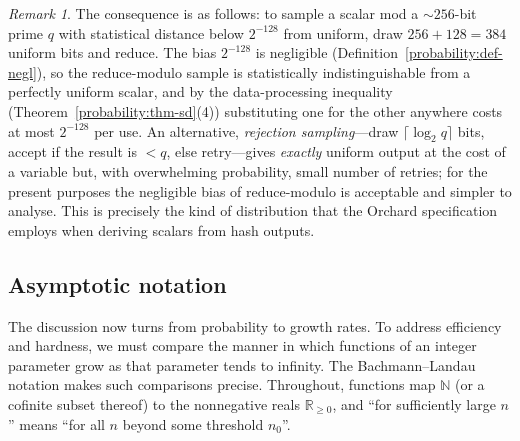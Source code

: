 \documentclass[11pt,a4paper]{article}
\theoremstyle{definition}
\theoremstyle{remark}
\newtheorem{remark}[theorem]{Remark}
\newcommand{\N}{\ensuremath{\mathbb{N}}}
\newcommand{\R}{\ensuremath{\mathbb{R}}}
\begin{document}
\begin{remark}\label{probability:rem-modbias}
The consequence is as follows: to sample a scalar mod a \(\sim 256\)-bit prime \(q\) with statistical distance below \(2^{-128}\) from uniform, draw \(256 + 128 = 384\) uniform bits and reduce. The bias \(2^{-128}\) is negligible (Definition~\ref{probability:def-negl}), so the reduce-modulo sample is statistically indistinguishable from a perfectly uniform scalar, and by the data-processing inequality (Theorem~\ref{probability:thm-sd}(4)) substituting one for the other anywhere costs at most \(2^{-128}\) per use. An alternative, \emph{rejection sampling}---draw \(\lceil \log_2 q\rceil\) bits, accept if the result is \(< q\), else retry---gives \emph{exactly} uniform output at the cost of a variable but, with overwhelming probability, small number of retries; for the present purposes the negligible bias of reduce-modulo is acceptable and simpler to analyse. This is precisely the kind of distribution that the Orchard specification employs when deriving scalars from hash outputs.
\end{remark}

\subsection{Asymptotic notation}

The discussion now turns from probability to growth rates. To address efficiency and hardness, we must compare the manner in which functions of an integer parameter grow as that parameter tends to infinity. The Bachmann--Landau notation makes such comparisons precise. Throughout, functions map \(\N\) (or a cofinite subset thereof) to the nonnegative reals \(\R_{\ge 0}\), and ``for sufficiently large \(n\)'' means ``for all \(n\) beyond some threshold \(n_0\)''.
\end{document}
